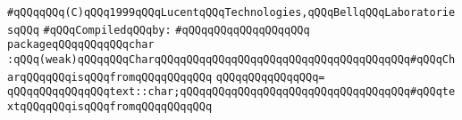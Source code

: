 \label{src/lib/std/char.pkg}
\verb|#qQQqqQQq(C)qQQq1999qQQqLucentqQQqTechnologies,qQQqBellqQQqLaboratoriesqQQq|\newline
\newline
\verb|#qQQqCompiledqQQqby:|\newline
\verb|#qQQqqQQqqQQqqQQqqQQq|\newline
\newline
\verb|packageqQQqqQQqqQQqchar|\newline
\verb|:qQQq(weak)qQQqqQQqCharqQQqqQQqqQQqqQQqqQQqqQQqqQQqqQQqqQQqqQQq#qQQqCharqQQqqQQqisqQQqfromqQQqqQQqqQQq|\newline
\verb|qQQqqQQqqQQqqQQq=|\newline
\verb|qQQqqQQqqQQqqQQqtext::char;qQQqqQQqqQQqqQQqqQQqqQQqqQQqqQQqqQQq#qQQqtextqQQqqQQqisqQQqfromqQQqqQQqqQQq|\newline
\newline

